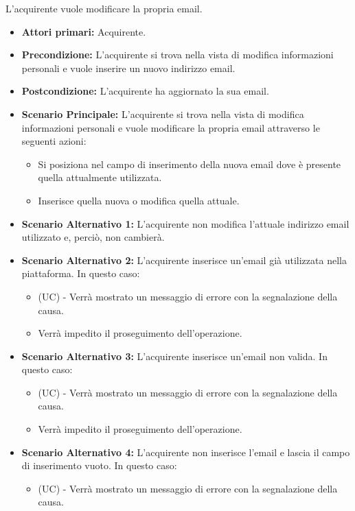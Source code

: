 L'acquirente vuole modificare la propria email.
\begin{itemize}
    \item \textbf{Attori primari:} Acquirente.
    \item \textbf{Precondizione:} L'acquirente si trova nella vista di modifica informazioni personali e vuole inserire un nuovo indirizzo email.
    \item \textbf{Postcondizione:} L'acquirente ha aggiornato la sua email.
    \item \textbf{Scenario Principale:} L'acquirente si trova nella vista di modifica informazioni personali e vuole modificare la propria email attraverso le seguenti azioni:
        \begin{itemize}
            \item Si posiziona nel campo di inserimento della nuova email dove è presente quella attualmente utilizzata.
            \item Inserisce quella nuova o modifica quella attuale.
        \end{itemize}
    \item \textbf{Scenario Alternativo 1:} L'acquirente non modifica l'attuale indirizzo email utilizzato e, perciò, non cambierà.
    \item \textbf{Scenario Alternativo 2:} L'acquirente inserisce un'email già utilizzata nella piattaforma. In questo caso:
    \begin{itemize}
        \item (UC) - Verrà mostrato un messaggio di errore con la segnalazione della causa.
        \item Verrà impedito il proseguimento dell'operazione.
    \end{itemize}
    \item \textbf{Scenario Alternativo 3:} L'acquirente inserisce un'email non valida. In questo caso:
    \begin{itemize}
        \item (UC) - Verrà mostrato un messaggio di errore con la segnalazione della causa.
        \item Verrà impedito il proseguimento dell'operazione.
    \end{itemize}
    \item \textbf{Scenario Alternativo 4:} L'acquirente non inserisce l'email e lascia il campo di inserimento vuoto. In questo caso:
    \begin{itemize}
        \item (UC) - Verrà mostrato un messaggio di errore con la segnalazione della causa.

\end{itemize}
\end{itemize}
